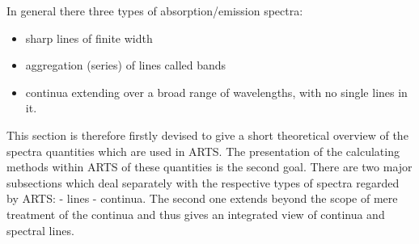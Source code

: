 \def\alphacs{\alpha_{\mbox{\sf c,s}}} 
\def\alphacf{\alpha_{\mbox{\sf c,f}}} 
%
\def\gamk{\gamma_{\sf k}}
\def\gamc{\gamma_{\sf c}}
%
\def\ws{w_{\sf s,k}}
\def\xs{x_{\sf s,k}}
\def\wf{w_{\sf f,k}}
\def\xf{x_{\sf f,k}}
%
\def\wn{\bar{\nu}}
\def\nucc{\nu_{\sf c}}
\def\nucut{\nu_{\sf cutoff}}
\def\nuo{\nu_{\mbox{\sf 0}}}
\def\nuk{\nu_{\sf k}}
%
\def\shape{F(\nu,\nuk)}
\def\shapec{F_{c}(\nu,\nuk)}
\def\shapefp{f_{c}(\nu,+\nuk)}
\def\shapefm{f_{c}(\nu,-\nuk)}
\def\shapefpm{f_{c}(\nu,\pm\nuk)}
\def\inten{S_{\sf k}(T)}
\def\inteno{S_{\sf k}(300\,K)}
\def\intencp{S_{\sf 0}(T)}
%
\def\fcs{\mbox{C}^{\mbox{\rm fit}}_{\mbox{\rm s}}} 
\def\fcf{\mbox{C}^{\mbox{\rm fit}}_{\mbox{\rm f}}}
\def\fcsf{\mbox{C}^{\mbox{\rm fit}}_{\mbox{\rm s,f}}} 
\def\tfcs{\mbox{C}^{\mbox{\rm fit}}_{\mbox{\rm s}}} 
\def\tfcf{\mbox{C}^{\mbox{\rm fit}}_{\mbox{\rm f}}} 
\def\tfcsf{\mbox{C}^{\mbox{\rm fit}}_{\mbox{\rm s,f}}} 
\def\tflncsf{\mbox{ln\,C}^{\mbox{\rm fit}}_{\mbox{\rm s,f}}} 
%
\def\cx{C_{\mbox{\sf x}}}
\def\cs{C_{\mbox{\sf H}_{2}\mbox{\sf O}}} 
\def\cf{C_{\mbox{\sf N}_{2}}} 
\def\cxo{C^{\mbox{\sf o}}_{\mbox{\sf X}}} 
\def\cso{C^{\mbox{\sf o}}_{\mbox{\sf H}_{2}\mbox{\sf O}}} 
\def\cfo{C^{\mbox{\sf o}}_{\mbox{\sf N}_{2}}} 
\def\cao{C^{\mbox{\sf o}}_{\mbox{\sf air}}}
\def\cdo{C^{\mbox{\sf o}}_{\mbox{\sf d}}}
\def\xx{{\sf n}_{\mbox{\sf x}}} 
\def\xs{{\sf n}_{\mbox{\sf s}}} 
\def\xf{{\sf n}_{\mbox{\sf f}}} 
\def\xd{{\sf n}_{\mbox{\sf d}}}
%




In general there three types of absorption/emission spectra:
\begin{itemize}
\item sharp lines of finite width
\item aggregation (series) of lines called bands
\item continua extending over a broad range of wavelengths, with
      no single lines in it.
\end{itemize}
This section is therefore firstly devised to give a short theoretical
overview of the spectra quantities which are used in ARTS. The presentation
of the calculating methods within ARTS of these quantities is the
second goal.
There are two major subsections which deal separately with the respective types
of spectra regarded by ARTS: 
- lines 
- continua.
The second one extends beyond the scope of mere treatment of the
continua and thus gives an integrated view of continua and spectral lines.


\label{sec:line_absorption}

